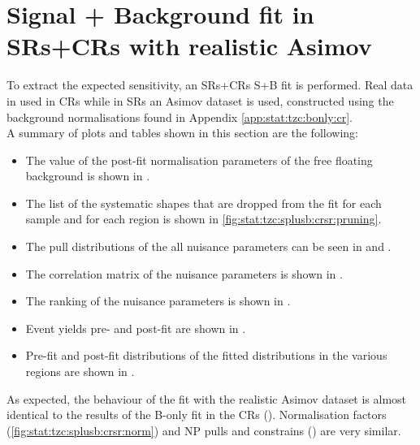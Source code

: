 \section{Signal + Background fit in SRs+CRs with realistic Asimov}
\label{sec:stat:tzc:splusb:crsr}
To extract the expected sensitivity, an SRs+CRs S+B fit is performed. 
Real data in used in CRs while in SRs an Asimov dataset is used,
constructed using the background normalisations found in Appendix \ref{app:stat:tzc:bonly:cr}.\\
A summary of plots and tables shown in this section are the following:
\begin{itemize}
\item The value of the post-fit normalisation parameters of the free floating background is shown in .
\item The list of the systematic shapes that are dropped from the fit for each sample and for each region is shown in \cref{fig:stat:tzc:splusb:crsr:pruning}.
\item The pull distributions of the all nuisance parameters can be seen in  and . 
\item The correlation matrix of the nuisance parameters is shown in . 
\item The ranking of the nuisance parameters is shown in . 
\item Event yields pre- and post-fit are shown in . 
\item Pre-fit and post-fit distributions of the fitted distributions in the various regions are shown in .
\end{itemize}
As expected, the behaviour of the fit with the realistic Asimov dataset
is almost identical to the results of the B-only fit in the CRs
(). 
Normalisation factors (\cref{fig:stat:tzc:splusb:crsr:norm}) and NP
pulls and constrains 
() 
are very similar. \\
